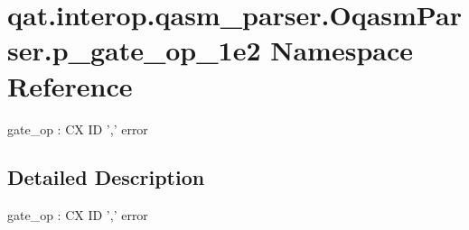 \hypertarget{namespaceqat_1_1interop_1_1qasm__parser_1_1OqasmParser_1_1p__gate__op__1e2}{\section{qat.\-interop.\-qasm\-\_\-parser.\-Oqasm\-Parser.\-p\-\_\-gate\-\_\-op\-\_\-1e2 Namespace Reference}
\label{namespaceqat_1_1interop_1_1qasm__parser_1_1OqasmParser_1_1p__gate__op__1e2}
}


gate\-\_\-op \-: C\-X I\-D ',' error  




\subsection{Detailed Description}
gate\-\_\-op \-: C\-X I\-D ',' error 
